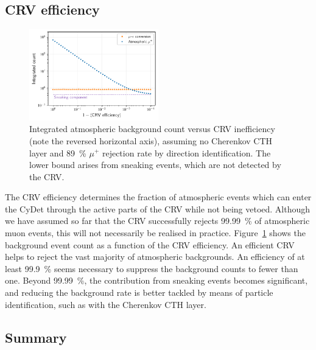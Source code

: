 \subsection{CRV efficiency}

\begin{figure}
    \centering
    \includegraphics[width=0.5\textwidth]{chapter6/bg_count_vs_crv_efficiency.pdf}
    \caption{ Integrated atmospheric background count versus CRV inefficiency
        (note the reversed horizontal axis), assuming no Cherenkov CTH layer and
        \SI{89}{\percent} $\mu^+$ rejection rate by direction identification.
        The lower bound arises from sneaking events, which are not detected by
        the CRV. 
        }
    \label{fig:bg_count_vs_crv_efficiency}
\end{figure}

The CRV efficiency determines the fraction of atmospheric events which can enter
the CyDet through the active parts of the CRV while not being vetoed. Although
we have assumed so far that the CRV successfully rejects \SI{99.99}{\percent} of
atmospheric muon events, this will not necessarily be realised in practice.
Figure~\ref{fig:bg_count_vs_crv_efficiency} shows the background event count as
a function of the CRV efficiency. An efficient CRV helps to reject the vast
majority of atmospheric backgrounds. An efficiency of at least
\SI{99.9}{\percent} seems necessary to suppress the background counts to fewer
than one. Beyond \SI{99.99}{\percent}, the contribution from sneaking events
becomes significant, and reducing the background rate is better tackled by means
of particle identification, such as with the Cherenkov CTH layer.

\subsection{Summary}

